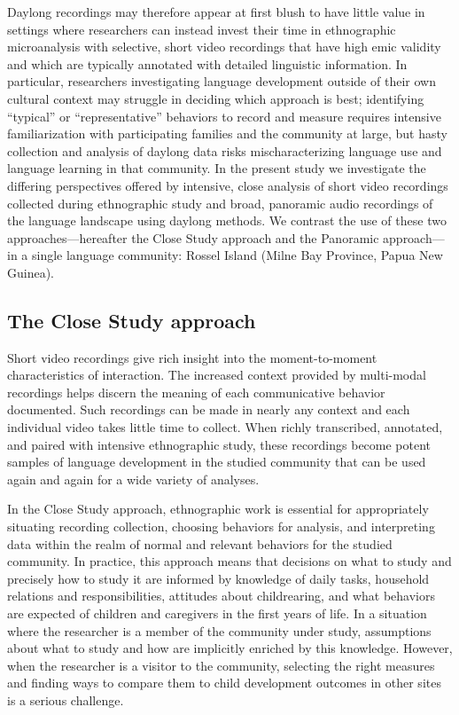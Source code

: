 \documentclass[,man,floatsintext]{apa6}
\begin{document}
Daylong recordings may therefore appear at first blush to have little
value in settings where researchers can instead invest their time in
ethnographic microanalysis with selective, short video recordings that
have high emic validity and which are typically annotated with detailed
linguistic information. In particular, researchers investigating
language development outside of their own cultural context may struggle
in deciding which approach is best; identifying \enquote{typical} or
\enquote{representative} behaviors to record and measure requires
intensive familiarization with participating families and the community
at large, but hasty collection and analysis of daylong data risks
mischaracterizing language use and language learning in that community.
In the present study we investigate the differing perspectives offered
by intensive, close analysis of short video recordings collected during
ethnographic study and broad, panoramic audio recordings of the language
landscape using daylong methods. We contrast the use of these two
approaches---hereafter the Close Study approach and the Panoramic
approach---in a single language community: Rossel Island (Milne Bay
Province, Papua New Guinea).

\subsection{The Close Study approach}\label{the-close-study-approach}

Short video recordings give rich insight into the moment-to-moment
characteristics of interaction. The increased context provided by
multi-modal recordings helps discern the meaning of each communicative
behavior documented. Such recordings can be made in nearly any context
and each individual video takes little time to collect. When richly
transcribed, annotated, and paired with intensive ethnographic study,
these recordings become potent samples of language development in the
studied community that can be used again and again for a wide variety of
analyses.

In the Close Study approach, ethnographic work is essential for
appropriately situating recording collection, choosing behaviors for
analysis, and interpreting data within the realm of normal and relevant
behaviors for the studied community. In practice, this approach means
that decisions on what to study and precisely how to study it are
informed by knowledge of daily tasks, household relations and
responsibilities, attitudes about childrearing, and what behaviors are
expected of children and caregivers in the first years of life. In a
situation where the researcher is a member of the community under study,
assumptions about what to study and how are implicitly enriched by this
knowledge. However, when the researcher is a visitor to the community,
selecting the right measures and finding ways to compare them to child
development outcomes in other sites is a serious challenge.
\end{document}
